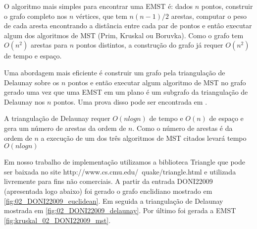 \documentclass[12pt,a4paper]{article}
\begin{document}


O algoritmo mais simples para encontrar uma EMST é: dados $n$ pontos, construir
o grafo completo nos $n$ vértices, que tem $n(n-1)/2$ arestas, computar o peso
de cada aresta encontrando a distância entre cada par de pontos e entâo executar
algum dos algoritmos de MST (Prim, Kruskal ou Boruvka). Como o grafo tem
$O(n^2)$ arestas para $n$ pontos distintos, a construção do grafo já requer
$O(n^2)$ de tempo e espaço.


Uma abordagem mais eficiente é construir um grafo pela triangulação de Delaunay
sobre os $n$ pontos e então executar algum algoritmo de MST no grafo gerado uma
vez que uma EMST em um plano é um subgrafo da triangulação de Delaunay nos $n$
pontos. Uma prova disso pode ser encontrada em \cite{subramani-computational}.

A triangulação de Delaunay requer $O(n log n)$ de tempo e $O(n)$ de espaço e
gera um número de arestas da ordem de $n$. Como o número de arestas é da ordem
de $n$ a execução de um dos três algoritmos de MST citados levará tempo $O(n log
n)$

Em nosso trabalho de implementação utilizamos a biblioteca Triangle que pode ser
baixada no site http://www.cs.cmu.edu/~quake/triangle.html e utilizada
livremente para fins não comerciais. %
A partir da entrada DONI22009 (apresentada logo abaixo) foi gerado o grafo
enclidiano mostrado em \ref{fig:02_DONI22009_euclidean}. Em seguida a
triangulação de Delaunay mostrada em \ref{fig:02_DONI22009_delaunay}. Por último
foi gerada a EMST \ref{fig:kruskal_02_DONI22009_mst}.


\end{document}

